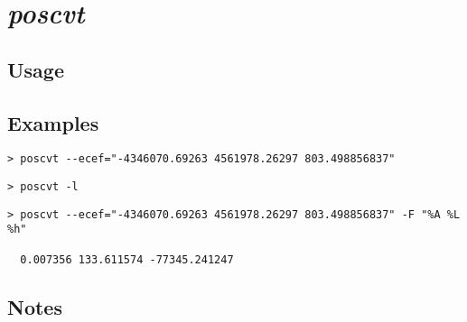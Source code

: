 \section{\emph{poscvt}}
\subsection{Usage}
\subsection{Examples}
\begin{Verbatim}
> poscvt --ecef="-4346070.69263 4561978.26297 803.498856837"
\end{Verbatim}
\begin{Verbatim}
> poscvt -l
\end{Verbatim}
\begin{Verbatim}
> poscvt --ecef="-4346070.69263 4561978.26297 803.498856837" -F "%A %L %h"

  0.007356 133.611574 -77345.241247
\end{Verbatim}
\subsection{Notes}

